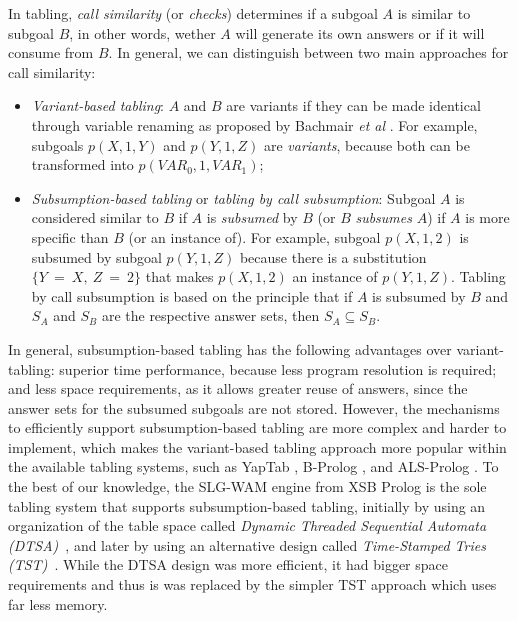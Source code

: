 In tabling, \emph{call similarity} (or \emph{checks}) determines if a subgoal $A$ is similar to subgoal $B$,
in other words, wether $A$ will generate its own answers or if it will consume from $B$. In general,
we can distinguish between two main approaches for call similarity:

\begin{itemize}
   \item \emph{Variant-based tabling}: $A$ and $B$ are variants if they can be made identical
   through variable renaming as proposed by Bachmair \textit{et al} \cite{Bachmair-93}.
   For example, subgoals $p(X,1,Y)$ and $p(Y,1,Z)$ are \emph{variants},
   because both can be transformed into $p(VAR_0,1,VAR_1)$;
   \item \emph{Subsumption-based tabling} or \emph{tabling by call subsumption}: Subgoal $A$ is considered similar
   to $B$ if $A$ is \emph{subsumed} by $B$ (or $B$ \emph{subsumes} $A$) if $A$ is more specific than $B$
   (or an instance of). For example, subgoal $p(X,1,2)$ is subsumed by subgoal $p(Y,1,Z)$ because there
   is a substitution $\{Y~=~X,~Z~=~2\}$ that makes $p(X,1,2)$ an instance of $p(Y,1,Z)$. Tabling by call
   subsumption is based on the principle that if $A$ is subsumed by $B$ and $S_A$ and $S_B$ are the respective
   answer sets, then $S_A \subseteq S_B$.
\end{itemize}

In general, subsumption-based tabling has the following advantages over variant-tabling:
superior time performance, because less program resolution is required; and less space requirements,
as it allows greater reuse of answers, since the answer sets for the subsumed subgoals are not stored.
However, the mechanisms to efficiently support subsumption-based tabling are more complex and harder to
implement, which makes the variant-based tabling approach more popular within the available tabling systems,
such as YapTab \cite{Rocha-00a}, B-Prolog \cite{Zhou-00}, and ALS-Prolog \cite{Guo-01}.
To the best of our knowledge, the SLG-WAM \cite{Sagonas-98} engine from XSB Prolog is the sole tabling system that supports
subsumption-based tabling, initially by using an organization of the table space called
\emph{Dynamic Threaded Sequential Automata (DTSA)}~\cite{Rao-96}, and later by using an alternative design called
\emph{Time-Stamped Tries (TST)}~\cite{Johnson-99}.
While the DTSA design was more efficient, it had bigger space requirements and thus is was replaced by the simpler
TST approach which uses far less memory.

